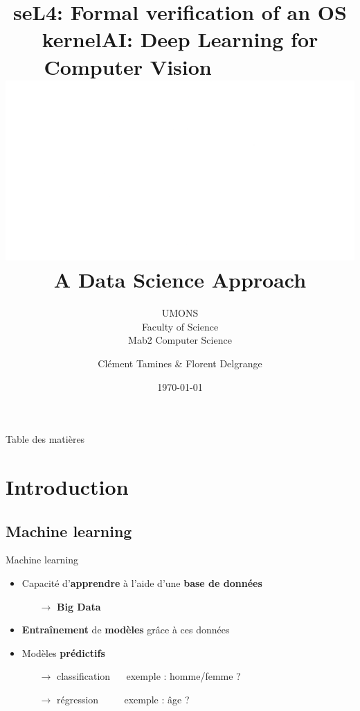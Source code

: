 \documentclass[compress]{beamer}
\title{seL4: Formal verification of an OS kernel} %
\author{Clément Tamines \& Florent Delgrange}
\subtitle{\normalsize UMONS \\ Faculty of Science \\ Mab2 Computer Science}
\date{\today}
\title{AI: Deep Learning for\\\vspace{-.05\linewidth} Computer Vision $\quad  \quad \quad \quad \quad$\includegraphics[width=0.2\linewidth]{resources/eye}\\
{\normalsize A Data Science Approach}} %
\begin{document}
  \begin{frame}[plain]
    \maketitle
  \end{frame}


\begin{frame}{Table des matières}
      \begin{multicols}{2}
        \tableofcontents[currentsection]
      \end{multicols}
\end{frame}

\section{Introduction}
\subsection{Machine learning}
\begin{frame}{Machine learning}
  \begin{itemize}
    \item Capacité d'\textbf{\color{fibeamer@orange}apprendre} à l'aide d'une \textbf{\color{fibeamer@orange}base de données}
    \begin{itemize}
      \item[$\rightarrow$] \textbf{\color{fibeamer@orange} Big Data}
    \end{itemize}
    \item \textbf{\color{fibeamer@orange}Entraînement} de \textbf{\color{fibeamer@orange}modèles} grâce à ces données
    \item Modèles \textbf{\color{fibeamer@orange}prédictifs}
    \begin{itemize}
      \item[$\rightarrow$] classification
        $\quad$ exemple : homme/femme ?
      \item[$\rightarrow$] régression $ \quad \quad$
        exemple : âge ?
    \end{itemize}
  \end{itemize}
\end{frame}
\end{document}
